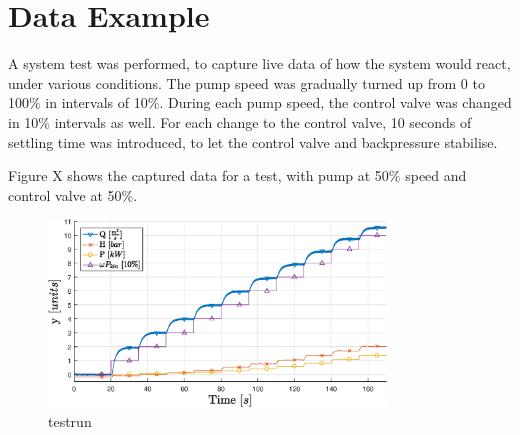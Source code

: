 
\section{Data Example}\label{sec:results}
A system test was performed, 
to capture live data of how the system would react, 
under various conditions.
The pump speed was gradually turned up from 0 to 100\% in intervals of 10\%. 
During each pump speed, the control valve was changed in 10\% intervals as well. 
For each change to the control valve, 
10 seconds of settling time was introduced, 
to let the control valve and backpressure stabilise.

Figure X shows the captured data for a test, with pump at 50\% speed and control valve at 50\%.

\begin{figure}[ht]
	\centering
	\includegraphics[width=0.8\textwidth]{figures/04ExperimentsAndLabWork/testrun}
	\vspace{-5mm}
	\caption{testrun}
	\label{fig:testrun}
\end{figure}
